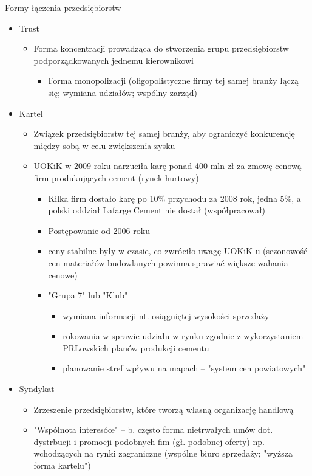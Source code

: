 \documentclass[a4paper,10pt]{report}
\begin{document}
Formy łączenia przedsiębiorstw
\begin{itemize}
	\item Trust
	\begin{itemize}
		\item Forma koncentracji prowadząca do stworzenia grupu przedsiębiorstw podporządkowanych jednemu kierownikowi
		\begin{itemize}
			\item Forma monopolizacji (oligopolistyczne firmy tej samej branży łączą się; wymiana udziałów; wspólny zarząd)
		\end{itemize}
	\end{itemize}
	\item Kartel
	\begin{itemize}
		\item Związek przedsiębiorstw tej samej branży, aby ograniczyć konkurencję między sobą w celu zwiększenia zysku
		\item UOKiK w 2009 roku narzuciła karę ponad 400 mln zł za zmowę cenową firm produkujących cement (rynek hurtowy)
		\begin{itemize}
			\item Kilka firm dostało karę po 10\% przychodu za 2008 rok, jedna 5\%, a polski oddział Lafarge Cement nie dostał (współpracował)
			\item Postępowanie od 2006 roku
			\item ceny stabilne były w czasie, co zwróciło uwagę UOKiK-u (sezonowość cen materiałów budowlanych powinna sprawiać większe wahania cenowe)
			\item "Grupa 7" lub "Klub"
			\begin{itemize}
				\item wymiana informacji nt. osiągniętej wysokości sprzedaży
				\item rokowania w sprawie udziału w rynku zgodnie z wykorzystaniem PRLowskich planów produkcji cementu
				\item planowanie stref wpływu na mapach -- "system cen powiatowych"
			\end{itemize}
		\end{itemize}
	\end{itemize}
	\item Syndykat
	\begin{itemize}
		\item Zrzeszenie przedsiębiorstw, które tworzą własną organizację handlową
		\item "Wspólnota interesóœ" -- b. często forma nietrwałych umów dot. dystrbucji i promocji podobnych fim (gł. podobnej oferty) np. wchodzących na rynki zagraniczne (wspólne biuro sprzedaży; "wyższa forma kartelu")

\end{itemize}
\end{itemize}
\end{document}
